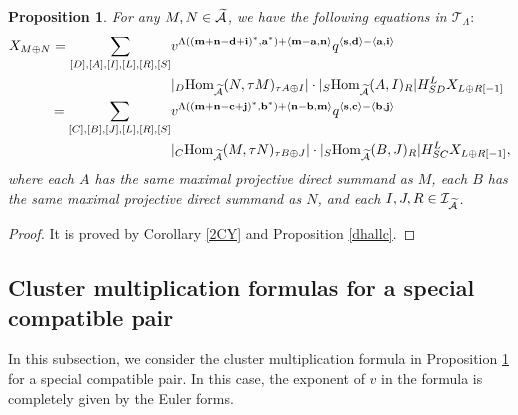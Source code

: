 \documentclass[reqno,12pt]{amsart}
\numberwithin{equation}{section}
\def\lr#1{\langle #1\rangle} \def\fin{\hfill$\square$}  \def\lra{\longrightarrow} \def\mod{\mbox{\rm \textbf{mod}}\,}\def\Mod{\mbox{\rm mod}\,}\def\top{\mbox{\rm top}\,}\def\soc{\mbox{\rm soc}\,}
\theoremstyle{plain} %
\newtheorem{proposition}[theorem]{\bf Proposition}
\theoremstyle{definition} %
\begin{document}
\begin{proposition}\label{2cycfgs}
For any $M,N\in\widetilde{\mathcal{A}}$, we have the following equations in $\mathcal{T}_\Lambda:$
\begin{equation*}
\begin{split}
X_{M\oplus N}=\sum\limits_{[D],[A],[I],[L],[R],[S]}&v^{\Lambda(({\bf m}+{\bf n}-{\bf d}+{\bf i})^\ast,{\bf a}^\ast)+\lr{{\bf m}-{\bf a},{\bf n}}}q^{\lr{{\bf s},{\bf d}}-\lr{{\bf a},{\bf i}}}\\&|_D\Hom_{\widetilde{\A}}(N,\tau M)_{\tau A\oplus I}|\cdot|{_S\Hom_{\widetilde{\A}}(A,I)_{R}}|H_{SD}^LX_{L\oplus R[-1]}\\
=\sum\limits_{[C],[B],[J],[L],[R],[S]}&v^{\Lambda(({\bf m}+{\bf n}-{\bf c}+{\bf j})^\ast,{\bf b}^\ast)+\lr{{\bf n}-{\bf b},{\bf m}}}
q^{\lr{{\bf s},{\bf c}}-\lr{{\bf b},{\bf j}}}\\&|_C\Hom_{\widetilde{\A}}(M,\tau N)_{\tau B\oplus J}|\cdot|{_S\Hom_{\widetilde{\A}}(B,J)_{R}}|H_{SC}^LX_{L\oplus R[-1]},
\end{split}
\end{equation*}
where each $A$ has the same maximal projective direct summand as $M$, each $B$ has the same maximal projective direct summand as $N$, and each $I,J,R\in\mathcal{I}_{\widetilde{\mathcal{A}}}$.
\end{proposition}
\begin{proof}
It is proved by Corollary \ref{2CY} and Proposition \ref{dhallc}.
\end{proof}




\subsection{Cluster multiplication formulas for a special compatible pair}
In this subsection, we consider the cluster multiplication formula in Proposition \ref{2cycfgs} for a special compatible pair. In this case, the exponent of $v$ in the formula is completely given by the Euler forms.
\end{document}

